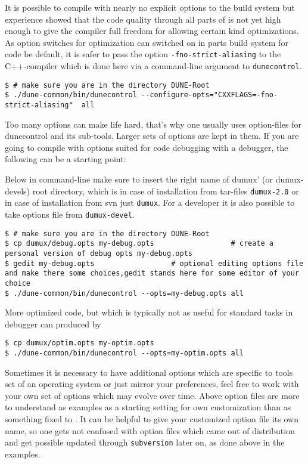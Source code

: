 It is possible to compile \Dumux with nearly no explicit options to the build system but
experience showed that the code quality through all parts of \Dune is not yet high enough to give the compiler full freedom for allowing certain kind optimizations. As option switches for optimization can switched on in parts build system for code be default, it is safer to pass the option \texttt{-fno-strict-aliasing} to the C++-compiler \cite{WIKIPED-ALIASING} which is done here via a command-line argument to \texttt{dunecontrol}.


\begin{lstlisting}[style=Bash]
$ # make sure you are in the directory DUNE-Root
$ ./dune-common/bin/dunecontrol --configure-opts="CXXFLAGS=-fno-strict-aliasing"  all
\end{lstlisting}

Too many options can make life hard, that's why one usually uses option-files for dunecontrol and its sub-tools.
Larger sets of options are kept in them. 
If you are going to compile with options suited for code debugging with a debugger, the following
can be a starting point:

Below in command-line make sure to insert the right name of dumux' (or dumux-devels) root directory, which is in case of installation from tar-files \texttt{dumux-2.0} or in case of installation from svn just \texttt{dumux}. For a developer it is also possible to take options file from \texttt{dumux-devel}.

\begin{lstlisting}[style=Bash]
$ # make sure you are in the directory DUNE-Root
$ cp dumux/debug.opts my-debug.opts                  # create a personal version of debug opts my-debug.opts
$ gedit my-debug.opts                  # optional editing options file and make there some choices,gedit stands here for some editor of your choice
$ ./dune-common/bin/dunecontrol --opts=my-debug.opts all 
\end{lstlisting}

More optimized code, but which is typically not as useful for standard tasks in debugger can produced by 

\begin{lstlisting}[style=Bash]
$ cp dumux/optim.opts my-optim.opts 
$ ./dune-common/bin/dunecontrol --opts=my-optim.opts all
\end{lstlisting}

Sometimes it is necessary to have additional options which are specific to tools set of an operating system or just mirror your preferences, feel free to work with your own set of options which may evolve over time. Above option files are more to understand as examples as a starting setting for own customization than as something fixed to \Dumux.
It can be helpful to give your customized option file its own name, so one gets not confused with option files which came out of distribution and get possible updated through \texttt{subversion} later on, as done above in the examples.

